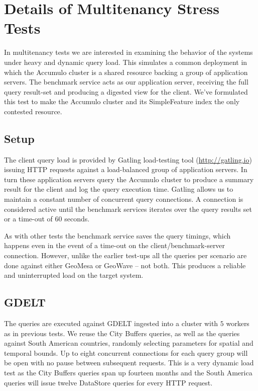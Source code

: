 \section{Details of Multitenancy Stress Tests}
\label{appendix:multitenancy}

In multitenancy tests we are interested in examining the behavior of the systems under heavy and dynamic query load.
This simulates a common deployment in which the Accumulo cluster is a shared resource backing a group of application servers.
The benchmark service acts as our application server, receiving the full query result-set and producing a digested view for the client.
We've formulated this test to make the Accumulo cluster and its SimpleFeature index the only contested resource.

\subsection{Setup}

The client query load is provided by Gatling load-testing tool (\url{http://gatling.io}) issuing HTTP requests against a load-balanced group of application servers.
In turn these application servers query the Accumulo cluster to produce a  summary result for the client and log the query execution time.
Gatling allows us to maintain a constant number of concurrent query connections.
A connection is considered active until the benchmark services iterates over the query results set or a time-out of $60$ seconds.

As with other tests the benchmark service saves the query timings, which happens even in the event of a time-out on the client/benchmark-server connection.
However, unlike the earlier test-ups all the queries per scenario are done against either GeoMesa or GeoWave -- not both.
This produces a reliable and uninterrupted load on the target system.

\subsection{GDELT}

The queries are executed against GDELT ingested into a cluster with $5$ workers as in previous tests.
We reuse the City Buffers queries, as well as the queries against South American countries,
randomly selecting parameters for spatial and temporal bounds.
Up to eight concurrent connections for each query group will be open with no pause between subsequent requests.
This is a very dynamic load test as the City Buffers queries span up fourteen months and the South America queries will issue twelve DataStore queries for every HTTP request.

